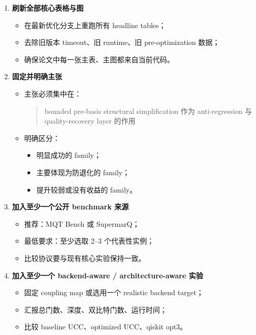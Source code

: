 \documentclass[11pt]{article}
\begin{document}
\begin{enumerate}
    \item \textbf{刷新全部核心表格与图}
    \begin{itemize}
        \item 在最新优化分支上重跑所有 headline tables；
        \item 去除旧版本 timeout、旧 runtime、旧 pre-optimization 数据；
        \item 确保论文中每一张主表、主图都来自当前代码。
    \end{itemize}

    \item \textbf{固定并明确主张}
    \begin{itemize}
        \item 主张必须集中在：
        \begin{quote}
        bounded pre-basis structural simplification 作为 anti-regression 与 quality-recovery layer 的作用
        \end{quote}
        \item 明确区分：
        \begin{itemize}
            \item 明显成功的 family；
            \item 主要体现为防退化的 family；
            \item 提升较弱或没有收益的 family。
        \end{itemize}
    \end{itemize}

    \item \textbf{加入至少一个公开 benchmark 来源}
    \begin{itemize}
        \item 推荐：MQT Bench 或 SupermarQ；
        \item 最低要求：至少选取 2--3 个代表性实例；
        \item 比较协议要与现有核心实验保持一致。
    \end{itemize}

    \item \textbf{加入至少一个 backend-aware / architecture-aware 实验}
    \begin{itemize}
        \item 固定 coupling map 或选用一个 realistic backend target；
        \item 汇报总门数、深度、双比特门数、运行时间；
        \item 比较 baseline UCC、optimized UCC、qiskit opt3。
    \end{itemize}


\end{enumerate}
\end{document}
